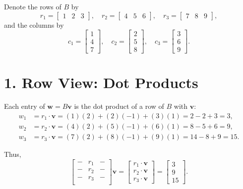 \documentclass[11pt]{article}
\begin{document}
Denote the rows of $B$ by
\[
r_1 = \begin{bmatrix} 1 & 2 & 3 \end{bmatrix}, \quad
r_2 = \begin{bmatrix} 4 & 5 & 6 \end{bmatrix}, \quad
r_3 = \begin{bmatrix} 7 & 8 & 9 \end{bmatrix},
\]
and the columns by
\[
c_1 = \begin{bmatrix} 1 \\ 4 \\ 7 \end{bmatrix}, \quad
c_2 = \begin{bmatrix} 2 \\ 5 \\ 8 \end{bmatrix}, \quad
c_3 = \begin{bmatrix} 3 \\ 6 \\ 9 \end{bmatrix}.
\]

\section*{1. Row View: Dot Products}

Each entry of $ \mathbf{w} = B\mathbf{v} $ is the dot product of a row of $ B $ with $ \mathbf{v} $:
\[
\begin{aligned}
w_1 &= r_1 \cdot \mathbf{v} = (1)(2) + (2)(-1) + (3)(1) = 2 - 2 + 3 = 3, \\
w_2 &= r_2 \cdot \mathbf{v} = (4)(2) + (5)(-1) + (6)(1) = 8 - 5 + 6 = 9, \\
w_3 &= r_3 \cdot \mathbf{v} = (7)(2) + (8)(-1) + (9)(1) = 14 - 8 + 9 = 15.
\end{aligned}
\]

Thus,
\[
\begin{bmatrix}
- & r_1 & - \\
- & r_2 & - \\
- & r_3 & - \\
\end{bmatrix} \mathbf{v}
=
\begin{bmatrix}
r_1 \cdot \mathbf{v} \\
r_2 \cdot \mathbf{v} \\
r_3 \cdot \mathbf{v}
\end{bmatrix}
=
\begin{bmatrix}
3 \\ 9 \\ 15
\end{bmatrix}.
\]
\end{document}
